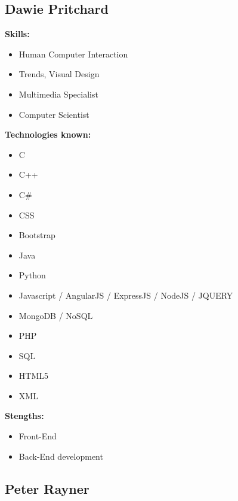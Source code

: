 \documentclass{article}
\begin{document}
\subsection{Dawie Pritchard}
\textbf{Skills:}
\begin{itemize}
 	\item Human Computer Interaction
 	\item Trends, Visual Design 
 	\item Multimedia Specialist
 	\item Computer Scientist
\end {itemize}
\textbf{Technologies known:}
\begin{itemize}
	\item C
 	\item C++
 	\item C\#
 	\item CSS
 	\item Bootstrap
 	\item Java
 	\item Python
 	\item Javascript / AngularJS / ExpressJS / NodeJS / JQUERY
 	\item MongoDB / NoSQL
 	\item PHP
 	\item SQL
 	\item HTML5
 	\item XML
 \end{itemize}
\textbf{Stengths:} 
\begin{itemize}
	\item Front-End
	\item Back-End development
\end{itemize}

\newpage
\subsection {Peter Rayner}
\end{document}
